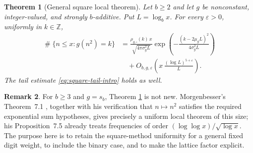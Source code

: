 \documentclass[11pt,reqno]{amsart}
\theoremstyle{plain}
\newtheorem{theorem}{Theorem}[section]
\theoremstyle{definition}
\newtheorem{remark}[theorem]{Remark}
\newcommand{\Z}{\mathbb{Z}}
\newcommand{\eps}{\varepsilon}
\newcommand{\1}{\mathbf 1}
\DeclareMathOperator{\Card}{\#}
\begin{document}
\begin{theorem}[General square local theorem]\label{thm:square-llt-general}
Let $b\ge2$ and let $g$ be nonconstant, integer-valued, and strongly $b$-additive.  Put $L=\log_bx$.  For every $\eps>0$, uniformly in $k\in\Z$,
\begin{equation}\label{eq:square-llt-general}
\begin{split}
 \Card\{n\le x:g(n^2)=k\}
 &=\frac{\rho_{g,\square}(k)\,x}{\sqrt{4\pi\sigma_g^2L}}
 \exp\!\left(-\frac{(k-2\mu_gL)^2}{4\sigma_g^2L}\right)\\
 &\quad+O_{b,g,\eps}\!\left(x\,\frac{(\log L)^{5+\eps}}{L}\right).
\end{split}
\end{equation}
The tail estimate \eqref{eq:square-tail-intro} holds as well.
\end{theorem}

\begin{remark}\label{rem:square-known-case}
For $b\ge3$ and $g=s_b$, Theorem \ref{thm:square-llt-general} is not new.  Morgenbesser's Theorem~7.1 \cite{morgenbesser}, together with his verification that $n\mapsto n^2$ satisfies the required exponential sum hypotheses, gives precisely a uniform local theorem of this size; his Proposition~7.5 already treats frequencies of order $(\log\log x)/\sqrt{\log x}$.  The purpose here is to retain the square-method uniformity for a general fixed digit weight, to include the binary case, and to make the lattice factor explicit.
\end{remark}
\end{document}

